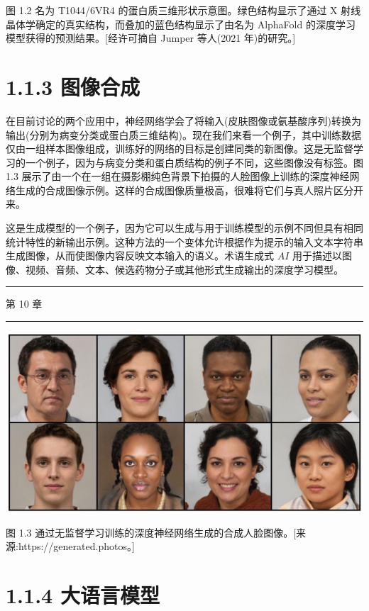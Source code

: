 \documentclass[10pt]{article}
\newcommand{\HRule}{\begin{center}\rule{0.9\linewidth}{0.2mm}\end{center}}
\begin{document}
图 1.2 名为 T1044/6VR4 的蛋白质三维形状示意图。绿色结构显示了通过 X 射线晶体学确定的真实结构，而叠加的蓝色结构显示了由名为 AlphaFold 的深度学习模型获得的预测结果。[经许可摘自 Jumper 等人(2021 年)的研究。]

\section*{1.1.3 图像合成}

在目前讨论的两个应用中，神经网络学会了将输入(皮肤图像或氨基酸序列)转换为输出(分别为病变分类或蛋白质三维结构)。现在我们来看一个例子，其中训练数据仅由一组样本图像组成，训练好的网络的目标是创建同类的新图像。这是无监督学习的一个例子，因为与病变分类和蛋白质结构的例子不同，这些图像没有标签。图 1.3 展示了由一个在一组在摄影棚纯色背景下拍摄的人脸图像上训练的深度神经网络生成的合成图像示例。这样的合成图像质量极高，很难将它们与真人照片区分开来。

这是生成模型的一个例子，因为它可以生成与用于训练模型的示例不同但具有相同统计特性的新输出示例。这种方法的一个变体允许根据作为提示的输入文本字符串生成图像，从而使图像内容反映文本输入的语义。术语生成式 \({AI}\) 用于描述以图像、视频、音频、文本、候选药物分子或其他形式生成输出的深度学习模型。

\HRule

第 10 章

\HRule

\begin{center}
\includegraphics[max width=1.0\textwidth]{images/0194e279-9b28-703a-88f4-c3ac21e2010d_24_231_352_1337_677_0.jpg}
\end{center}
\hspace*{3em} 

图 1.3 通过无监督学习训练的深度神经网络生成的合成人脸图像。[来源:https://generated.photos。]

\section*{1.1.4 大语言模型}
\end{document}
